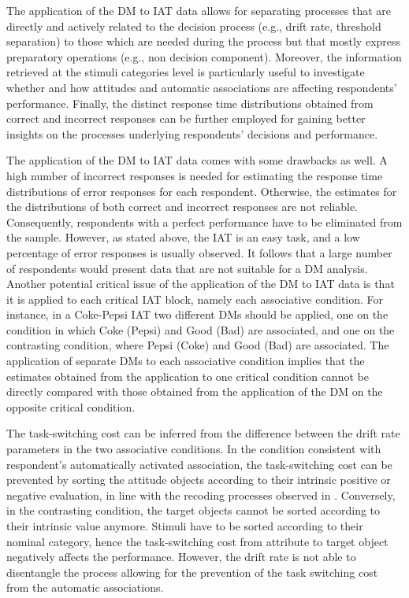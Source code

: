 \documentclass[12pt]{book}
\begin{document}
The application of the DM to IAT data allows for separating processes that are directly and actively related to the decision process (e.g., drift rate, threshold separation) to those which are needed during the process but that mostly express preparatory operations (e.g., non decision component). 
Moreover, the information retrieved at the stimuli categories level is particularly useful to investigate whether and how attitudes and automatic associations are affecting respondents' performance. 
Finally, the distinct response time distributions obtained from correct and incorrect responses can be further employed for gaining better insights on the processes underlying respondents' decisions and performance.

The application of the DM to IAT data comes with some drawbacks as well. 
A high number of incorrect responses is needed for estimating the response time distributions of error responses for each respondent.  
Otherwise, the estimates for the distributions of both correct and incorrect responses are not reliable. 
Consequently, respondents with a perfect performance have to be eliminated from the sample.
However, as stated above, the IAT is an easy task, and a low percentage of error responses is usually observed. It follows that a large number of respondents would present data that are not suitable for a DM analysis. 
Another potential critical issue of the application of the DM to IAT data is that it is applied to each critical IAT block, namely each associative condition. 
For instance, in a Coke-Pepsi IAT two different DMs should be applied, one on the condition in which Coke (Pepsi) and Good (Bad) are associated, and one on the contrasting condition, where Pepsi (Coke) and Good (Bad) are associated.
	The application of separate DMs to each associative condition implies that the estimates obtained from the application to one critical condition cannot be directly compared with those obtained from the application of the DM on the opposite critical condition.

The task-switching cost can be inferred from the difference between the drift rate parameters in the two associative conditions. 
In the condition consistent with respondent's automatically activated association, the task-switching cost can be prevented by sorting the attitude objects according to their intrinsic positive or negative evaluation, in line with the recoding processes observed in . 
Conversely, in the contrasting condition, the target objects cannot be sorted according to their intrinsic value anymore. Stimuli have to be sorted according to their nominal category, hence the task-switching cost from attribute to target object negatively affects the performance.
However, the drift rate is not able to disentangle the process allowing for the prevention of the task switching cost from the automatic associations.
\end{document}
